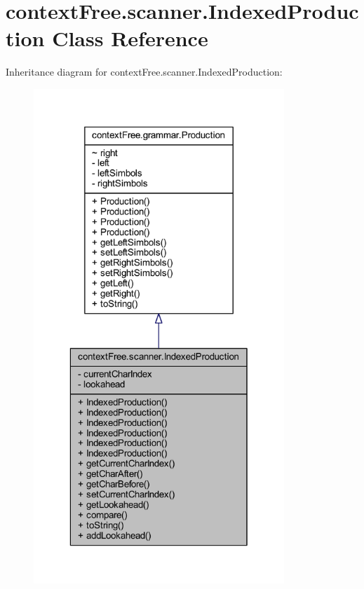\hypertarget{classcontext_free_1_1scanner_1_1_indexed_production}{\section{context\-Free.\-scanner.\-Indexed\-Production Class Reference}
\label{classcontext_free_1_1scanner_1_1_indexed_production}
}


Inheritance diagram for context\-Free.\-scanner.\-Indexed\-Production\-:\nopagebreak
\begin{figure}[H]
\begin{center}
\leavevmode
\includegraphics[width=268pt]{classcontext_free_1_1scanner_1_1_indexed_production__inherit__graph}
\end{center}
\end{figure}


